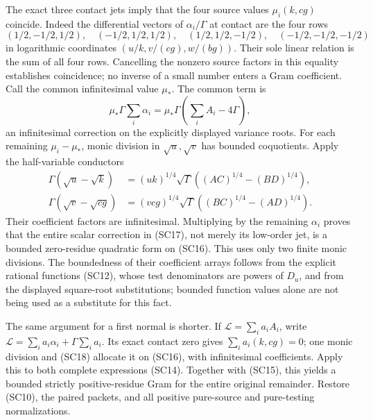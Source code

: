 The exact three contact jets imply that the four source values
$\mu_i(k,cg)$ coincide. Indeed the differential vectors of
$\alpha_i/\Gamma$ at contact are the four rows
\[
 (1/2,-1/2,1/2),\quad(-1/2,1/2,1/2),\quad
 (1/2,1/2,-1/2),\quad(-1/2,-1/2,-1/2)
\]
in logarithmic coordinates $(u/k,v/(cg),w/(bg))$. Their sole linear
relation is the sum of all four rows. Cancelling the nonzero source
factors in this equality establishes coincidence; no inverse of a
small number enters a Gram coefficient.
Call the common infinitesimal value $\mu_*$. The common term is
\[
 \mu_*\Gamma\sum_i\alpha_i
   =\mu_*\Gamma\left(\sum_iA_i-4\Gamma\right),
\]
an infinitesimal correction on the explicitly displayed variance roots.
For each remaining $\mu_i-\mu_*$, monic division in $\sqrt u,\sqrt v$
has bounded coquotients. Apply the half-variable conductors
\[
\begin{aligned}
 \Gamma(\sqrt u-\sqrt k)
   &=(uk)^{1/4}\sqrt\Gamma
          ((AC)^{1/4}-(BD)^{1/4}),\\
 \Gamma(\sqrt v-\sqrt{cg})
   &=(vcg)^{1/4}\sqrt\Gamma
          ((BC)^{1/4}-(AD)^{1/4}).
\end{aligned}                                                     \tag{SC20}
\]
Their coefficient factors are infinitesimal. Multiplying by the
remaining $\alpha_i$ proves that the entire scalar correction in
(SC17), not merely its low-order jet, is a bounded zero-residue
quadratic form on (SC16). This uses only two finite monic divisions.
The boundedness of their coefficient arrays follows from the explicit
rational functions (SC12), whose test denominators are powers of
$D_u$, and from the displayed square-root substitutions; bounded
function values alone are not being used as a substitute for this fact.

The same argument for a first normal is shorter. If
$\mathcal L=\sum_i a_iA_i$, write
$\mathcal L=\sum_i a_i\alpha_i+\Gamma\sum_i a_i$.
Its exact contact zero gives $\sum_i a_i(k,cg)=0$; one monic division
and (SC18) allocate it on (SC16), with infinitesimal coefficients.
Apply this to both complete expressions (SC14).
Together with (SC15), this yields a bounded strictly positive-residue
Gram for the entire original remainder. Restore (SC10), the paired
packets, and all positive pure-source and pure-testing normalizations.

